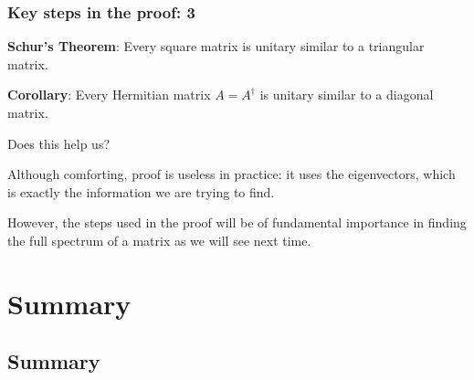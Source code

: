 \documentclass{beamer}
\begin{document}
\begin{frame}
  \frametitle{Key steps in the proof: 3}

  {\bf Schur's Theorem}: Every square matrix is unitary similar to a
  triangular matrix.

  \vspace{1ex}

  {\bf Corollary}: Every Hermitian matrix $A = A^{\dagger}$ is unitary
  similar to a diagonal matrix.

  \vspace{1ex}

  Does this help us? \pause

  \vspace{1ex}

  Although comforting, proof is useless in practice: it uses the
  eigenvectors, which is exactly the information we are trying to
  find.\pause

  \vspace{1ex}

  However, the steps used in the proof will be of fundamental importance
  in finding the full spectrum of a matrix as we will see next time.

\end{frame}





\section{Summary}

\subsection{Summary}
\end{document}

